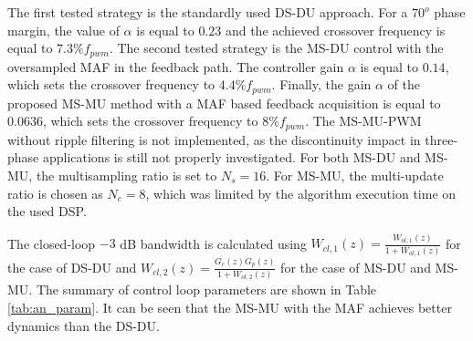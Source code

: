 \documentclass[conference]{IEEEtran}
\begin{document}
The first tested strategy is the standardly used DS-DU approach. For a $70^o$ phase margin, the value of $\alpha$ is equal to $0.23$ and the achieved crossover frequency is equal to $7.3 \% f_{pwm}$.
The second tested strategy is the MS-DU control with the oversampled MAF in the feedback path. The controller gain $\alpha$ is equal to $0.14$, which sets the crossover frequency to $4.4 \% f_{pwm}$.
Finally, the gain $\alpha$ of the proposed MS-MU method with a MAF based feedback acquisition is equal to $0.0636$, which sets the crossover frequency to $8 \%  f_{pwm}$. The MS-MU-PWM without ripple filtering is not implemented, as the discontinuity impact in three-phase applications is still not properly investigated.
For both MS-DU and MS-MU, the multisampling ratio is set to $N_s = 16$. For MS-MU, the multi-update ratio is chosen as $N_c = 8$, which was limited by the algorithm execution time on the used DSP.

The closed-loop $-3$ dB bandwidth is calculated using $W_{cl,1}(z) = \frac{W_{ol,1}(z)}{1+W_{ol,1}(z)}$ for the case of DS-DU and $W_{cl,2}(z) = \frac{G_c(z) G_p(z)}{1+W_{ol,2}(z)}$ for the case of MS-DU and MS-MU. The summary of control loop parameters are shown in Table \ref{tab:an_param}. It can be seen that the MS-MU with the MAF achieves better dynamics than the DS-DU.
\end{document}
